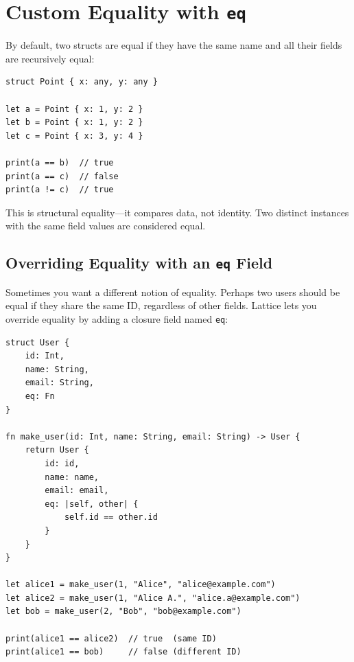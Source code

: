 \section{Custom Equality with \texttt{eq}}\label{sec:struct-equality}

By default, two structs are equal if they have the same name and all their
fields are recursively equal:

\begin{lstlisting}[language=Lattice, caption={Default struct equality}]
struct Point { x: any, y: any }

let a = Point { x: 1, y: 2 }
let b = Point { x: 1, y: 2 }
let c = Point { x: 3, y: 4 }

print(a == b)  // true
print(a == c)  // false
print(a != c)  // true
\end{lstlisting}

This is structural equality---it compares data, not identity. Two distinct
instances with the same field values are considered equal.

\subsection{Overriding Equality with an \texttt{eq} Field}

Sometimes you want a different notion of equality. Perhaps two users should
be equal if they share the same ID, regardless of other fields. Lattice
lets you override equality by adding a closure field named \lstinline|eq|:

\begin{lstlisting}[language=Lattice, caption={Custom equality via the \texttt{eq} field}]
struct User {
    id: Int,
    name: String,
    email: String,
    eq: Fn
}

fn make_user(id: Int, name: String, email: String) -> User {
    return User {
        id: id,
        name: name,
        email: email,
        eq: |self, other| {
            self.id == other.id
        }
    }
}

let alice1 = make_user(1, "Alice", "alice@example.com")
let alice2 = make_user(1, "Alice A.", "alice.a@example.com")
let bob = make_user(2, "Bob", "bob@example.com")

print(alice1 == alice2)  // true  (same ID)
print(alice1 == bob)     // false (different ID)
\end{lstlisting}

